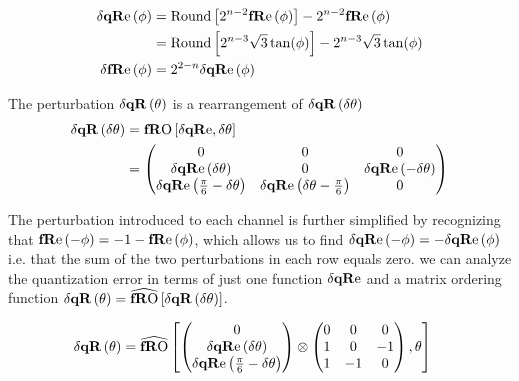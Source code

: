 \begin{align*}
\dqRe[\phi] &= \text{Round}\left[ 2^{n-2} \fRe[\phi ] \right]-2^{n-2}\fRe[\phi ] \\
&=  \text{Round}\left[ 2^{n-3}\sqrt{3} \tan (\phi ) \right]-2^{n-3}\sqrt{3} \tan (\phi )\\
\dfRe[\phi] &= 2^{2-n} \dqRe[\phi]  
\end{align*}

The perturbation $\dqR[\theta]$ is a rearrangement of $\dqR[\thetaA] $ 
\begin{align*}
\dqR[\thetaA] &= \fRO[\dqRe, \thetaA ] \\
 &=
\begin{pmatrix}
 0                                     & 0                                   & 0                     \\
 \dqRe[ \thetaA ]              & 0                                   & \dqRe[ -\thetaA ] \\
 \dqRe[ \Pii{6} -\thetaA]   & \dqRe[\thetaA-\Pii{6} ] & 0                     \\
\end{pmatrix}
\end{align*}

The perturbation introduced to each channel is further simplified by recognizing that $\fRe[-\phi]=-1-\fRe[\phi]$, which allows us to find $\dqRe[-\phi]=-\dqRe[\phi]$ i.e. that the sum of the two perturbations in each row equals zero. we can analyze the quantization error in terms of just one function $\dqRe$ and a matrix ordering function $\dqR[\theta] = \fROm \left[ \dqR[ \thetaA ]  \right]$.

\begin{align*}
\dqR[\theta] &= \fROm \left[  
\begin{pmatrix}
 0                                     \\
 \dqRe[ \thetaA ]              \\
 \dqRe[ \Pii{6} -\thetaA]   \\
\end{pmatrix} \otimes
\begin{pmatrix}
 0  &    0  &   0  \\
 1  &    0  & -1  \\
 1  & - 1  &   0  \\
\end{pmatrix}
  ,\theta \right]
\end{align*}



